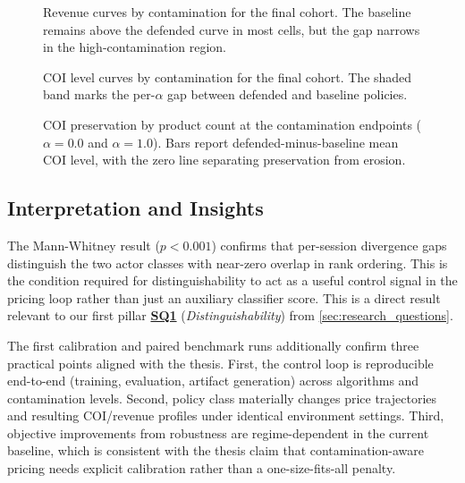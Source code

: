 \begin{figure}[ht]
    \centering
    
    \caption{Revenue curves by contamination for the final cohort. The baseline remains above the defended curve in most cells, but the gap narrows in the high-contamination region.}
    \label{fig:final_focus_revenue_by_alpha}
\end{figure}

\begin{figure}[ht]
    \centering
    
    \caption{COI level curves by contamination for the final cohort. The shaded band marks the per-$\alpha$ gap between defended and baseline policies.}
    \label{fig:final_focus_coi_by_alpha}
\end{figure}

\begin{figure}[ht]
    \centering
    
    \caption{COI preservation by product count at the contamination endpoints ($\alpha=0.0$ and $\alpha=1.0$). Bars report defended-minus-baseline mean COI level, with the zero line separating preservation from erosion.}
    \label{fig:final_focus_coi_preservation_grid}
\end{figure}



\subsection{Interpretation and Insights}
The Mann-Whitney result ($p<0.001$) confirms that per-session divergence gaps distinguish the two actor classes with near-zero overlap in rank ordering. This is the condition required for distinguishability to act as a useful control signal in the pricing loop rather than just an auxiliary classifier score. This is a direct result relevant to our first pillar \hyperlink{sq1}{\textbf{SQ1}} (\textit{Distinguishability}) from \cref{sec:research_questions}.

The first calibration and paired benchmark runs additionally confirm three practical points aligned with the thesis. First, the control loop is reproducible end-to-end (training, evaluation, artifact generation) across algorithms and contamination levels. Second, policy class materially changes price trajectories and resulting COI/revenue profiles under identical environment settings. Third, objective improvements from robustness are regime-dependent in the current baseline, which is consistent with the thesis claim that contamination-aware pricing needs explicit calibration rather than a one-size-fits-all penalty.

